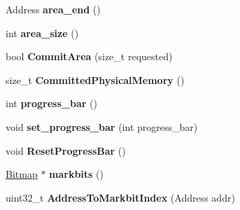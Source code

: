 \begin{DoxyCompactItemize}
\item 
Address {\bfseries area\+\_\+end} ()\hypertarget{classv8_1_1internal_1_1_memory_chunk_ad3898b428d291ef457bc87c2999ff18d}{}\label{classv8_1_1internal_1_1_memory_chunk_ad3898b428d291ef457bc87c2999ff18d}

\item 
int {\bfseries area\+\_\+size} ()\hypertarget{classv8_1_1internal_1_1_memory_chunk_ada395cf5efb11ccb21b0f084729f065c}{}\label{classv8_1_1internal_1_1_memory_chunk_ada395cf5efb11ccb21b0f084729f065c}

\item 
bool {\bfseries Commit\+Area} (size\+\_\+t requested)\hypertarget{classv8_1_1internal_1_1_memory_chunk_a14e11434bb32c16ed64018db481b3f14}{}\label{classv8_1_1internal_1_1_memory_chunk_a14e11434bb32c16ed64018db481b3f14}

\item 
size\+\_\+t {\bfseries Committed\+Physical\+Memory} ()\hypertarget{classv8_1_1internal_1_1_memory_chunk_ab2dc12e2563ade1687d90983ac514f23}{}\label{classv8_1_1internal_1_1_memory_chunk_ab2dc12e2563ade1687d90983ac514f23}

\item 
int {\bfseries progress\+\_\+bar} ()\hypertarget{classv8_1_1internal_1_1_memory_chunk_a475ac028bc95b39e8b80d90d4881b99f}{}\label{classv8_1_1internal_1_1_memory_chunk_a475ac028bc95b39e8b80d90d4881b99f}

\item 
void {\bfseries set\+\_\+progress\+\_\+bar} (int progress\+\_\+bar)\hypertarget{classv8_1_1internal_1_1_memory_chunk_afc84974db55bd3d9f7b7f59a7fe9b8d6}{}\label{classv8_1_1internal_1_1_memory_chunk_afc84974db55bd3d9f7b7f59a7fe9b8d6}

\item 
void {\bfseries Reset\+Progress\+Bar} ()\hypertarget{classv8_1_1internal_1_1_memory_chunk_ac13610ea6eb684978417777426efa41f}{}\label{classv8_1_1internal_1_1_memory_chunk_ac13610ea6eb684978417777426efa41f}

\item 
\hyperlink{classv8_1_1internal_1_1_bitmap}{Bitmap} $\ast$ {\bfseries markbits} ()\hypertarget{classv8_1_1internal_1_1_memory_chunk_ab24fe2fc15e5b41706c99c5be3e4282f}{}\label{classv8_1_1internal_1_1_memory_chunk_ab24fe2fc15e5b41706c99c5be3e4282f}

\item 
uint32\+\_\+t {\bfseries Address\+To\+Markbit\+Index} (Address addr)\hypertarget{classv8_1_1internal_1_1_memory_chunk_ab5034cf79ef9bd456426b830aa87fd61}{}\label{classv8_1_1internal_1_1_memory_chunk_ab5034cf79ef9bd456426b830aa87fd61}


\end{DoxyCompactItemize}
